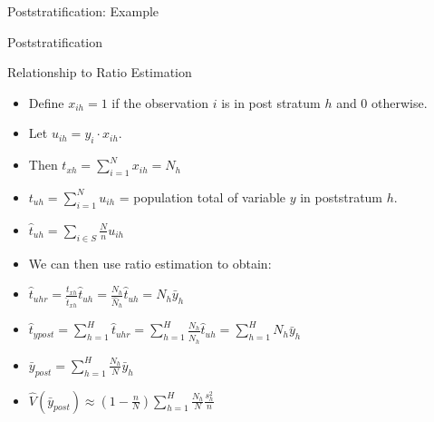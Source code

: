 \documentclass[10pt]{beamer}\usepackage[]{graphicx}\usepackage[]{xcolor}
\begin{document}
\begin{frame}{Poststratification: Example}

\end{frame}


\begin{frame}{Poststratification}
\begin{block}{Relationship to Ratio Estimation}
\begin{itemize}
\item Define $x_{ih}=1$ if the observation $i$ is in post stratum $h$ and 0 otherwise.
\item Let $u_{ih}=y_i \cdot x_{ih}$.
\item Then $t_{xh} = \sum_{i=1}^N x_{ih}=N_h$ 
\item $t_{uh} = \sum_{i=1}^N u_{ih}$ = population total of variable $y$ in poststratum $h$.
\item $\hat{t}_{uh} = \sum_{i \in S} \frac{N}{n} u_{ih}$
\item We can then use ratio estimation to obtain:
\item $\hat{t}_{uhr} = \frac{t_{xh}}{\hat{t}_{xh}}\hat{t}_{uh}= \frac{N_h}{\hat{N}_h}\hat{t}_{uh} = N_h\bar{y}_h$
\item $\hat{t}_{ypost} = \sum_{h=1}^H \hat{t}_{uhr} = \sum_{h=1}^H \frac{N_h}{\hat{N}_h}\hat{t}_{uh} = \sum_{h=1}^H N_h\bar{y}_h$
\item $\bar{y}_{post} = \sum_{h=1}^H \frac{N_h}{N}\bar{y}_h$
\item $\hat{V}(\bar{y}_{post}) \approx \left(1-\frac{n}{N}\right) \sum_{h=1}^H \frac{N_h}{N} \frac{s_h^2}{n}$
\end{itemize}
\end{block}
\end{frame}
\end{document}

